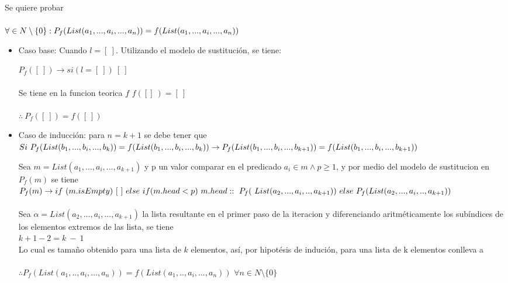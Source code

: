 \documentclass[12pt, a4paper]{article}
\begin{document}
Se quiere probar \\ \\
\begin{math}
\centering
\forall \in N \setminus \{0\} : P_f(List(a_1,...,a_i,...,a_n)) = f(List(a_1,...,a_i,...,a_n))
\end{math}
\\
\begin{itemize}
\item{Caso base: Cuando $l = [\ ]$. Utilizando el modelo de sustitución, se tiene:}

$P_f([\ ]) \rightarrow si(l = [\ ]) \ [\ ]$ \\ \\
Se tiene en la funcion teorica $f$
$f([]\ ) = [\ ]$\\ \\
$\therefore ~ P_f([\ ]) = f([\ ])$ \\
\item{Caso de inducción: para $n = k + 1$ se debe tener que }\\

\begin{math}
Si~P_f(List(b_1,...,b_i,...,b_k)) = f (List(b_1,...,b_i,...,b_k)) \\
\rightarrow P_f(List(b_1,...,b_i,...,b_{k + 1})) = f (List(b_1,...,b_i,...,b_{k + 1}))
\end{math}

Sea $m = List(a_1,...,a_i,..., a_{k +1})$ y p un valor comparar en el predicado $a_i \in m \land p \geq 1$, y por medio del modelo de sustitucion en $P_f(m)$ se tiene\\

$P_f(m) \rightarrow if~(m.isEmpty)~[\ ]~else~if( m.head < p)~m.head::\\~P_f(~List(a_2,...,a_i,..,a_{k+1}))~else~P_f(List(a_2,...,a_i,..,a_{k+1}))$ \\ \\
Sea $\alpha = List(a_2,...,a_i,...,a_{k+1})$ la lista resultante en el primer paso de la iteracion y diferenciando aritméticamente los subíndices de los elementos extremos de las lista, se tiene \\
$ k + 1 - 2 = k~-~1$ \\
Lo cual es tamaño obtenido para una lista de $k$ elementos, así, por hipotésis de indución, para una lista de k elementos conlleva a\\ \\
$\therefore P_f(List(a_1,..,a_i,...,a_n)) = f(List(a_1,..,a_i,...,a_n))$ $\forall n \in N \setminus \{0\}$

\end{itemize}
\end{document}
